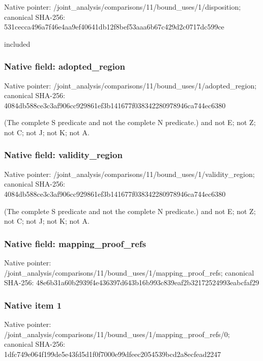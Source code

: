 \documentclass[10pt,a4paper]{article}
\begin{document}
Native pointer: /joint\_analysis/comparis\allowbreak{}ons/11/bound\_uses/1/disp\allowbreak{}osition; canonical SHA-256: 531cecca496a7f46e4aa9ef4\allowbreak{}0641db12f8bef53aaa6b67c4\allowbreak{}29d2c0717dc599ce


included


\subsubsection{Native field: adopted\_region}


Native pointer: /joint\_analysis/comparis\allowbreak{}ons/11/bound\_uses/1/adop\allowbreak{}ted\_region; canonical SHA-256: 4084db588ce3c3af906cc929\allowbreak{}861ef3b141677f0383422809\allowbreak{}78946ca744ec6380


(The complete S predicate and not the complete N predicate.) and not E; not Z; not C; not J; not K; not A.


\subsubsection{Native field: validity\_region}


Native pointer: /joint\_analysis/comparis\allowbreak{}ons/11/bound\_uses/1/vali\allowbreak{}dity\_region; canonical SHA-256: 4084db588ce3c3af906cc929\allowbreak{}861ef3b141677f0383422809\allowbreak{}78946ca744ec6380


(The complete S predicate and not the complete N predicate.) and not E; not Z; not C; not J; not K; not A.


\subsubsection{Native field: mapping\_proof\_refs}


Native pointer: /joint\_analysis/comparis\allowbreak{}ons/11/bound\_uses/1/mapp\allowbreak{}ing\_proof\_refs; canonical SHA-256: 48e6b31a60b2939f4e436397\allowbreak{}d643b16b993c839eaf2b3217\allowbreak{}2524993eabcfaf29



\subsubsection{Native item 1}


Native pointer: /joint\_analysis/comparis\allowbreak{}ons/11/bound\_uses/1/mapp\allowbreak{}ing\_proof\_refs/0; canonical SHA-256: 1dfc749e064f199de5e43fd5\allowbreak{}d1f0f7000e99dfeec2054539\allowbreak{}bcd2a8ecfead2247
\end{document}
